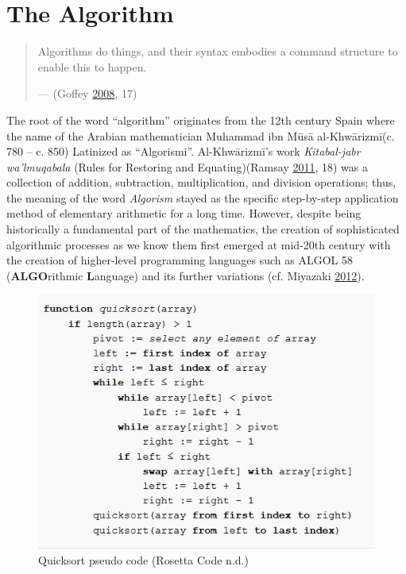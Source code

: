 \documentclass[12pt,twoside]{report}
\begin{document}
\hypertarget{the-algorithm}{%
\section{The Algorithm}\label{the-algorithm}}

\begin{quote}
Algorithms do things, and their syntax embodies a command structure to enable this to happen.

--- (Goffey \protect\hyperlink{ref-Goffey2008}{2008}, 17)
\end{quote}

The root of the word ``algorithm'' originates from the 12th century Spain where the name of the Arabian mathematician Muhammad ibn Mūsā al-Khwārizmī(c. 780 -- c. 850) Latinized as ``Algorismi''. Al-Khwārizmī's work \emph{Kitabal-jabr wa'lmuqabala} (Rules for Restoring and Equating)(Ramsay \protect\hyperlink{ref-Ramsay2011}{2011}, 18) was a collection of addition, subtraction, multiplication, and division operations; thus, the meaning of the word \emph{Algorism} stayed as the specific step-by-step application method of elementary arithmetic for a long time. However, despite being historically a fundamental part of the mathematics, the creation of sophisticated algorithmic processes as we know them first emerged at mid-20th century with the creation of higher-level programming languages such as ALGOL 58 (\textbf{ALGO}rithmic \textbf{L}anguage) and its further variations (cf. Miyazaki \protect\hyperlink{ref-Miyazaki2012}{2012}).

\begin{figure}

{\centering \includegraphics{quickboy} 

}

\caption{Quicksort pseudo code (Rosetta Code n.d.)}\label{fig:quickboy}
\end{figure}
\end{document}

